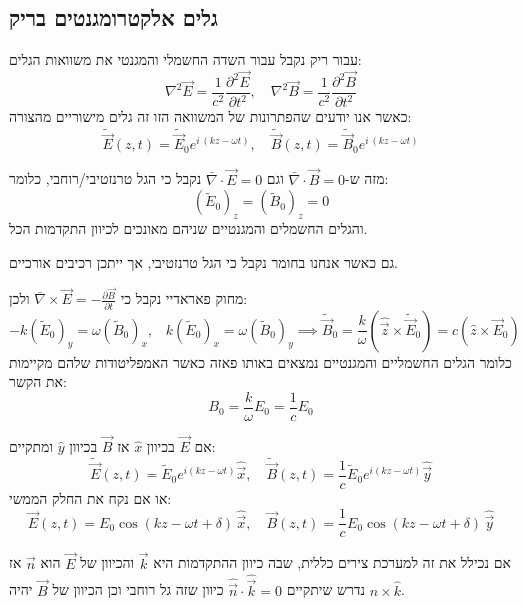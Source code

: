 \documentclass{tstextbook}
\begin{document}
\subsection{גלים אלקטרומגנטים בריק}

עבור ריק נקבל עבור השדה החשמלי והמגנטי את משוואות הגלים:
$$\nabla^{2}\vec{E}=\frac{1}{c^{2}}{\frac{\partial^{2}\vec{E}}{\partial t^{2}}},\quad\nabla^{2}\vec{B}=\frac{1}{c^{2}}{\frac{\partial^{2}\vec{B}}{\partial t^{2}}}$$
כאשר אנו יודעים שהפתרונות של המשוואה הזו זה גלים מישוריים מהצורה:
$$\tilde{\vec E}(z,t)=\tilde{\vec E}_{0}e^{i\,(k z-\omega t)},\quad\tilde{\vec B}(z,t)=\tilde{\vec B}_{0}e^{i\,(k z-\omega t)}$$

\begin{proposition}
מזה ש-\(\bar{\nabla} \cdot \vec{B}=0\) וגם \(\bar{\nabla} \cdot \vec{E}=0\) נקבל כי הגל טרנזטיבי/רוחבי, כלומר:
$$(\tilde{E}_{0})_{z}=(\tilde{B}_{0})_{z}=0$$
והגלים החשמלים והמגנטיים שניהם מאונכים לכיוון התקדמות הכל.

\end{proposition}
\begin{remark}
גם כאשר אנחנו בחומר נקבל כי הגל טרנזטיבי, אך ייתכן רכיבים אורכיים.

\end{remark}
\begin{proposition}
מחוק פאראדיי נקבל כי \(\bar{\nabla} \times \vec{E}=-\frac{\partial \vec{B}}{\partial t}\) ולכן:
$$-k\left( \tilde{E}_{0} \right)_{y}=\omega\left( \tilde{B}_{0} \right)_{x},\;\;\;k\left( \tilde{E}_{0} \right)_{x}=\omega\left( \tilde{B}_{0} \right)_{y}\implies \tilde{{\vec B}}_{0}=\frac{k}{\omega}\left( \hat{{\vec z}}\times\tilde{{\vec E}}_{0} \right)=c\left( \hat{z}\times \vec{E}_{0} \right)$$
כלומר הגלים החשמליים והמגנטיים נמצאים באותו פאזה כאשר האמפליטודות שלהם מקיימות את הקשר:
$$B_{0}=\frac{k}{\omega}E_{0}=\frac{1}{c}E_{0}$$

\end{proposition}
\begin{example}
אם \(\vec{E}\) בכיוון \(\hat{x}\) אז \(\vec{B}\) בכיוון \(\hat{y}\) ומתקיים:
$$\tilde{\vec E}(z,t)=\tilde{E}_{0}e^{i(k z-\omega t)}\hat{\vec x},\quad\tilde{\vec B}(z,t)=\frac1c\tilde{E}_{0}e^{i(k z-\omega t)}\hat{\vec y}$$
או אם נקח את החלק הממשי:
$$\vec{E}(z,t)=E_{0}\cos(k z-\omega t+\delta)\,{\hat{\vec{x}}},\quad\vec{B}(z,t)={\frac{1}{c}}E_{0}\cos(k z-\omega t+\delta)\,{\hat{\vec{y}}}$$

\end{example}
\begin{remark}
אם נכילל את זה למערכת צירים כללית, שבה כיוון ההתקדמות היא \(\vec{k}\) והכיוון של \(\vec{E}\) הוא \(\vec{n}\) אז נדרש שיתקיים \({\hat{\vec{n}}}\cdot{\hat{\vec{k}}}=0\) כיוון שזה גל רוחבי וכן הכיוון של \(\vec{B}\) יהיה \(\hat{n} \times \hat{k}\).

\end{remark}
\end{document}
